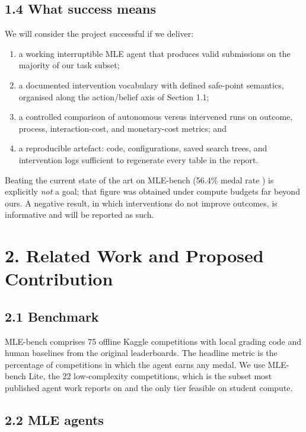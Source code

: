 \documentclass[11pt]{article}
\begin{document}
\subsection*{1.4 What success means}

We will consider the project successful if we deliver:
\begin{enumerate}[leftmargin=*,itemsep=0.15em]
    \item a working interruptible MLE agent that produces valid submissions on the
          majority of our task subset;
    \item a documented intervention vocabulary with defined safe-point semantics,
          organised along the action/belief axis of Section 1.1;
    \item a controlled comparison of autonomous versus intervened runs on outcome,
          process, interaction-cost, and monetary-cost metrics; and
    \item a reproducible artefact: code, configurations, saved search trees, and
          intervention logs sufficient to regenerate every table in the report.
\end{enumerate}
Beating the current state of the art on MLE-bench (56.4\% medal rate
\cite{mlmaster2}) is explicitly \emph{not} a goal; that figure was obtained under
compute budgets far beyond ours. A negative result, in which interventions do not
improve outcomes, is informative and will be reported as such.

\section*{2. Related Work and Proposed Contribution}

\subsection*{2.1 Benchmark}

MLE-bench \cite{mlebench} comprises 75 offline Kaggle competitions with local grading
code and human baselines from the original leaderboards. The headline metric is the
percentage of competitions in which the agent earns any medal. We use MLE-bench Lite,
the 22 low-complexity competitions, which is the subset most published agent work
reports on and the only tier feasible on student compute.

\subsection*{2.2 MLE agents}
\end{document}
